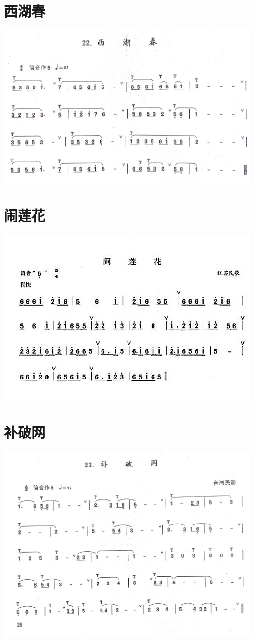 \documentclass[cn,pad,chinese,chinesefont=nofont]{elegantbook}
\begin{document}
\section{西湖春}          
	\includegraphics[width=\textwidth]{dongxiao/IMG_0935.jpg} 
\section{闹莲花}
    \includegraphics[width=\textwidth]{dongxiao/20200323凄凉犯.jpg}    
\section{补破网}           
	\includegraphics[width=\textwidth]{dongxiao/IMG_0936.jpg}
\end{document}

